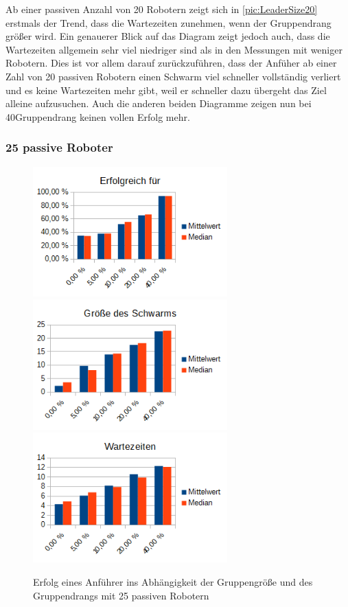 Ab einer passiven Anzahl von 20 Robotern zeigt sich in \autoref{pic:LeaderSize20} erstmals der Trend, dass die Wartezeiten zunehmen, wenn der Gruppendrang größer wird. Ein genauerer Blick auf das Diagram zeigt jedoch auch, dass die Wartezeiten allgemein sehr viel niedriger sind als in den Messungen mit weniger Robotern. Dies ist vor allem darauf zurückzuführen, dass der Anfüher ab einer Zahl von 20 passiven Robotern einen Schwarm viel schneller vollständig verliert und es keine Wartezeiten mehr gibt, weil er schneller dazu übergeht das Ziel alleine aufzusuchen. Auch die anderen beiden Diagramme zeigen nun bei 40\per Gruppendrang keinen vollen Erfolg mehr.

\subsubsection*{25 passive Roboter}

\begin{figure}[h]
	\includegraphics[width=7.5cm, keepaspectratio]{graphics/Statistics/Leader/FlockSize/25_1.png}
	\includegraphics[width=7.5cm, keepaspectratio]{graphics/Statistics/Leader/FlockSize/25_2.png}
	\includegraphics[width=7.5cm, keepaspectratio]{graphics/Statistics/Leader/FlockSize/25_3.png}
	\caption{Erfolg eines Anführer ins Abhängigkeit der Gruppengröße und des Gruppendrangs mit 25 passiven Robotern}
	\label{pic:LeaderSize25}
\end{figure}

